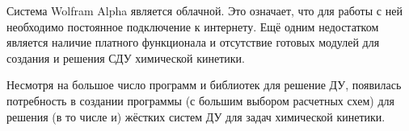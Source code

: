 Система Wolfram Alpha является облачной. Это означает, что для работы с ней необходимо постоянное подключение к интернету. Ещё
одним недостатком является наличие платного функционала и отсутствие готовых модулей для создания и решения СДУ химической кинетики.

Несмотря на большое число программ и библиотек для решение ДУ, появилась потребность в создании программы (с большим выбором расчетных
схем) для решения (в то числе и) жёстких систем
ДУ для задач химической кинетики.